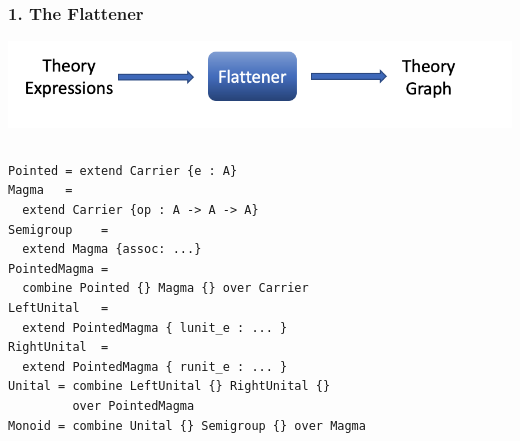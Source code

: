 \documentclass[t,10pt,numbers,fleqn,usenames,xcolor=dvipsnames]{beamer}
\begin{document}
\begin{frame}[fragile]
\frametitle{1. The Flattener} 
\begin{center}
\includegraphics[scale=0.2]{figures/flattener.png}
\end{center}

\begin{overprint}
\begin{columns}
\begin{column}{0.45\textwidth}
\begin{verbatim}
Pointed = extend Carrier {e : A}
Magma   = 
  extend Carrier {op : A -> A -> A}
Semigroup    = 
  extend Magma {assoc: ...}
PointedMagma = 
  combine Pointed {} Magma {} over Carrier
LeftUnital   = 
  extend PointedMagma { lunit_e : ... }
RightUnital  = 
  extend PointedMagma { runit_e : ... }
Unital = combine LeftUnital {} RightUnital {} 
         over PointedMagma
Monoid = combine Unital {} Semigroup {} over Magma
\end{verbatim}
\end{column}
\begin{column}{0.45\textwidth}



{\tiny
}
\end{column}
\end{columns}
\end{overprint}
\end{frame}

\begin{frame}[fragile] 

\end{frame}
\end{document}
